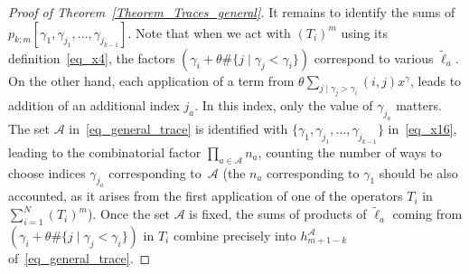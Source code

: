 \documentclass[11pt]{article}
\theoremstyle{definition}
\numberwithin{equation}{section}
\begin{document}
\begin{proof}[Proof of Theorem~\ref{Theorem_Traces_general}]
It remains to identify the sums of $p_{k;m}[\gamma_1,\gamma_{j_1},\dots,\gamma_{j_{k-1}}]$. Note that when we act with $(T_i)^m$ using its definition~\eqref{eq_x4}, the factors $\left(\gamma_i + \theta \#\{j\mid \gamma_j<\gamma_i\}\right)$ correspond to various $\tilde \ell_a$. On the other hand, each application
of a term from $\theta \sum_{j\mid \gamma_j>\gamma_i} (i,j) x^{\gamma}$, leads to addition of an additional index ${j_a}$. In this index, only the value of $\gamma_{j_a}$ matters. The set $\mathcal A$ in~\eqref{eq_general_trace} is identified with $\{\gamma_1,\gamma_{j_1},\dots,\gamma_{j_{k-1}}\}$ in~\eqref{eq_x16}, leading to the combinatorial factor $\prod_{a\in \mathcal A} n_a$, counting the number of ways to choose indices $\gamma_{j_a}$ corresponding to~$\mathcal A$ (the $n_a$ corresponding to $\gamma_1$ should be also accounted, as it arises from the first application of one of the operators $T_i$ in $\sum_{i=1}^N (T_i)^m$). Once the set $\mathcal A$ is fixed, the sums of products of $\tilde \ell_a$ coming from $\left(\gamma_i + \theta \#\{j\mid \gamma_j<\gamma_i\}\right)$ in $T_i$ combine precisely into $h^{\mathcal A}_{m+1-k}$ of~\eqref{eq_general_trace}.
\end{proof}
\end{document}
